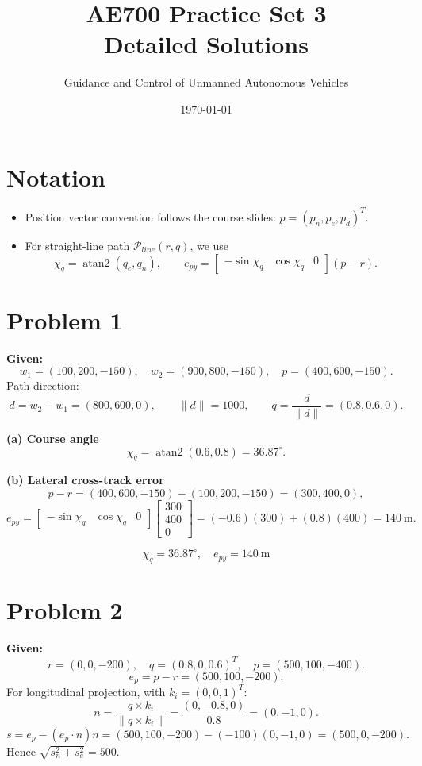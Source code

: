 \documentclass[11pt,a4paper]{article}
\title{AE700 Practice Set 3\\Detailed Solutions}
\author{Guidance and Control of Unmanned Autonomous Vehicles}
\date{\today}
\begin{document}
\maketitle
\tableofcontents
\newpage

\section*{Notation}
\begin{itemize}
  \item Position vector convention follows the course slides: $p=(p_n,p_e,p_d)^T$.
  \item For straight-line path $\mathcal P_{line}(r,q)$, we use
  \[
  \chi_q=\operatorname{atan2}(q_e,q_n), \qquad
  e_{py}=\begin{bmatrix}-\sin\chi_q & \cos\chi_q & 0\end{bmatrix}(p-r).
  \]
\end{itemize}

\section{Problem 1}
\textbf{Given:}
\[
w_1=(100,200,-150),\quad w_2=(900,800,-150),\quad p=(400,600,-150).
\]
Path direction:
\[
d=w_2-w_1=(800,600,0),\qquad \|d\|=1000,\qquad q=\frac{d}{\|d\|}=(0.8,0.6,0).
\]

\textbf{(a) Course angle}
\[
\chi_q=\operatorname{atan2}(0.6,0.8)=36.87^\circ.
\]

\textbf{(b) Lateral cross-track error}
\[
p-r=(400,600,-150)-(100,200,-150)=(300,400,0),
\]
\[
e_{py}=
\begin{bmatrix}
-\sin\chi_q & \cos\chi_q & 0
\end{bmatrix}
\begin{bmatrix}
300\\400\\0
\end{bmatrix}
=(-0.6)(300)+(0.8)(400)=140~\text{m}.
\]

\[
\boxed{\chi_q=36.87^\circ,\quad e_{py}=140~\text{m}}
\]

\section{Problem 2}
\textbf{Given:}
\[
r=(0,0,-200),\quad q=(0.8,0,0.6)^T,\quad p=(500,100,-400).
\]
\[
e_p=p-r=(500,100,-200).
\]
For longitudinal projection, with $k_i=(0,0,1)^T$:
\[
n=\frac{q\times k_i}{\|q\times k_i\|}
=\frac{(0,-0.8,0)}{0.8}=(0,-1,0).
\]
\[
s=e_p-(e_p\cdot n)n=(500,100,-200)-(-100)(0,-1,0)=(500,0,-200).
\]
Hence $\sqrt{s_n^2+s_e^2}=500$.
\end{document}
